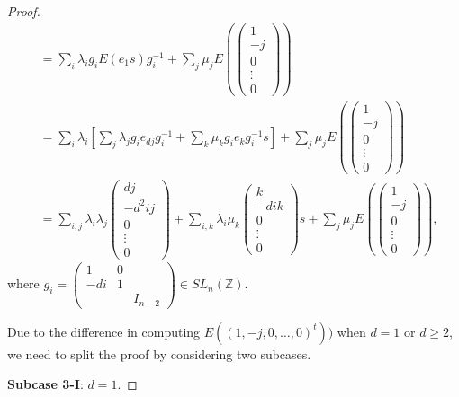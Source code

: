 \documentclass[12pt]{amsart}
\theoremstyle{definition}
\theoremstyle{remark}
\begin{document}
\begin{proof}
\begin{align*}
&=\sum_i\lambda_i g_{i}E(e_1s)g_{i}^{-1}
+\sum_j\mu_jE(\left(\begin{smallmatrix}
1\\
-j\\
0\\
\vdots\\
0
\end{smallmatrix}\right))\\
&=\sum\limits_{i} \lambda_{i} \left[\sum\limits_{j} \lambda_{j}g_{i}e_{dj}g_{i}^{-1} + \sum\limits_{k} \mu_{k}g_{i}e_{k}g_{i}^{-1}s\right] + \sum_j\mu_jE(\left(\begin{smallmatrix}
1\\
-j\\
0\\
\vdots\\
0
\end{smallmatrix}\right))\\
&=\sum_{i,j}\lambda_i\lambda_j\left(\begin{smallmatrix}
dj\\
-d^2ij\\
0\\
\vdots\\
0
\end{smallmatrix}\right)+\sum_{i, k}\lambda_i\mu_k\left(\begin{smallmatrix}
k\\
-dik\\
0\\
\vdots\\
0
\end{smallmatrix}\right)s+\sum_j\mu_jE(\left(\begin{smallmatrix}
1\\
-j\\
0\\
\vdots\\
0
\end{smallmatrix}\right)),
\end{align*}
where $g_{i} = \left(\begin{smallmatrix}
 1 & 0 \\
-di & 1 \\
     & & I_{n-2}
\end{smallmatrix}\right) \in SL_{n}(\mathbb{Z})$.


Due to the difference in computing $E((1,-j,0,\ldots, 0)^t))$ when $d=1$ or $d\ge2$, we need to split the proof by considering two subcases.

\textbf{Subcase 3-I}: $d=1$.



\end{proof}
\end{document}
